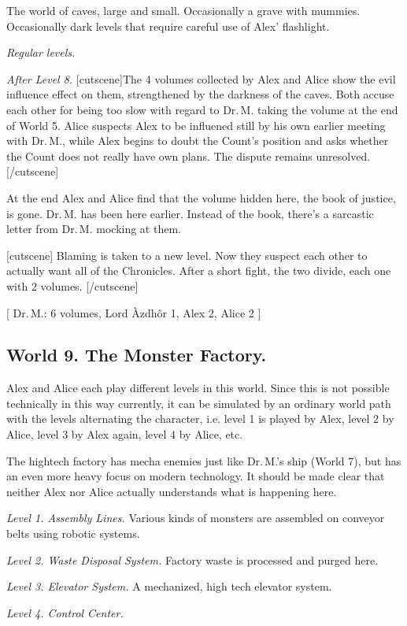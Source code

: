 \documentclass{gd-document}
\newcommand\DrM{Dr.\,M.\xspace}
\newcommand\Azdhor{Lord Àzdhôr\xspace}
\newcommand\level[1]{\textit{#1}}
\begin{document}
The world of caves, large and small. Occasionally a grave with
mummies. Occasionally dark levels that require careful use of Alex’
flashlight.

\level{Regular levels.}

\level{After Level 8.} [cutscene]The 4 volumes collected by Alex and
Alice show the evil influence effect on them, strengthened by the
darkness of the caves. Both accuse each other for being too
slow with regard to \DrM taking the volume at the end of World
5. Alice suspects Alex to be influened still by his own earlier
meeting with \DrM, while Alex begins to doubt the Count’s position and
asks whether the Count does not really have own plans. The dispute
remains unresolved.[/cutscene]

At the end Alex and Alice find that the volume hidden here, the book of
justice, is gone. \DrM has been here earlier. Instead of the book,
there’s a sarcastic letter from \DrM mocking at them.

[cutscene]
Blaming is taken to a new level. Now they suspect each other to
actually want all of the Chronicles. After a short fight, the two
divide, each one with 2 volumes.
[/cutscene]

[ \DrM: 6 volumes, \Azdhor 1, Alex 2, Alice 2 ]

\subsection{World 9. The Monster Factory.}

Alex and Alice each play different levels in this world. Since this is
not possible technically in this way currently, it can be simulated by
an ordinary world path with the levels alternating the character,
i.e. level 1 is played by Alex, level 2 by Alice, level 3 by Alex
again, level 4 by Alice, etc.

The hightech factory has mecha enemies just like \DrM’s ship (World 7), but has
an even more heavy focus on modern technology. It should be made clear
that neither Alex nor Alice actually understands what is happening
here.

\level{Level 1. Assembly Lines.} Various kinds of monsters are assembled on
conveyor belts using robotic systems.

\level{Level 2. Waste Disposal System.} Factory waste is processed and purged
here.

\level{Level 3. Elevator System.} A mechanized, high tech elevator system.

\level{Level 4. Control Center.}
\end{document}
